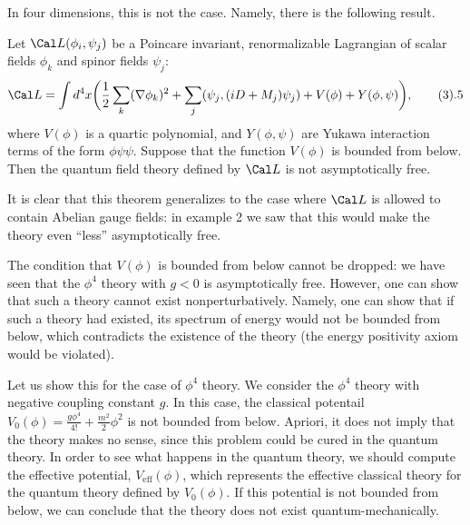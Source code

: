 In four dimensions, this is not the case. Namely, there is
the following result.

 Let $\Cal L(\phi_i,\psi_j)$ be a 
Poincare invariant, renormalizable Lagrangian 
of scalar fields $\phi_k$ and spinor fields $\psi_j$:
$$
\Cal L=\int d^4x\biggl(
\frac{1}{2}\sum_k (\nabla\phi_k)^2+
\sum_j(\psi_j,(iD+M_j)\psi_j) 
+V(\phi)+Y(\phi,\psi)\biggr),\tag 3.5
$$
where $V(\phi)$ is a quartic polynomial, and 
$Y(\phi,\psi)$ are Yukawa interaction terms of the form 
$\phi\psi\psi$. Suppose that the function 
$V(\phi)$ is bounded from below. Then the quantum field theory 
defined by $\Cal L$ is not asymptotically free. 
\endproclaim

It is clear that this theorem generalizes to the case where $\Cal L$ 
is allowed to contain Abelian gauge fields: in example 2 we saw that 
this would make the theory even ``less'' asymptotically free. 

The condition that $V(\phi)$ is bounded from below 
cannot be dropped: we have seen 
that the $\phi^4$ theory with $g<0$ is asymptotically 
free. However, one can show that 
such a theory cannot exist nonperturbatively. 
Namely, one can show that if such a theory had existed, 
its spectrum of energy would not be bounded from below, 
which contradicts the existence of the theory
(the energy positivity axiom would be violated).

Let us show this for the case of $\phi^4$ theory. 
We consider the $\phi^4$ theory with negative coupling constant $g$. 
In this case, the classical potentail $V_0(\phi)=\frac{g\phi^4}{4!}
+\frac{m^2}{2}\phi^2$ is not bounded from below. Apriori, it does not 
imply that the theory makes no sense, since 
this problem could be cured in the quantum theory. 
In order to see what happens in the quantum theory, we should 
compute the effective potential, $V_{\text{eff}}(\phi)$,
which represents the effective classical theory for the quantum theory 
defined by $V_0(\phi)$. If this potential is not bounded from below, 
we can conclude that the theory does not exist quantum-mechanically.

